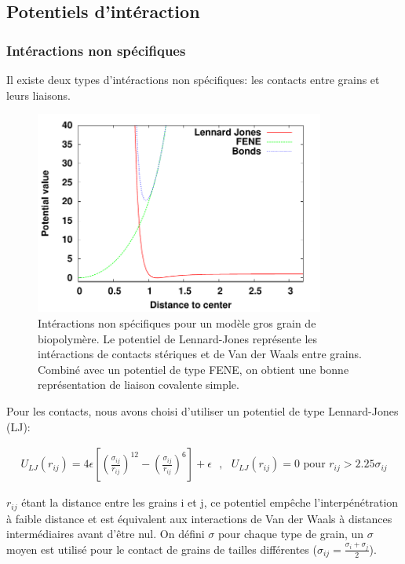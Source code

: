 \subsection{Potentiels d'intéraction}

\subsubsection{Intéractions non spécifiques}

Il existe deux types d'intéractions non spécifiques: les contacts entre grains et leurs liaisons. 

\begin{figure}[H]
\begin{center}
\includegraphics[width=0.85\textwidth]{nonspec.pdf}

\caption[Potentiels stériques]{Intéractions non spécifiques pour un modèle gros grain de biopolymère. Le potentiel de Lennard-Jones représente les intéractions de contacts stériques et de Van der Waals entre grains. Combiné avec un potentiel de type FENE, on obtient une bonne représentation de liaison covalente simple.}
\label{nonspecificinterac}
\end{center}
\end{figure}


Pour les contacts, nous avons choisi d'utiliser un potentiel de type Lennard-Jones (LJ):

\begin{eqnarray}
U_{LJ}(r_{ij})= 4\epsilon \left[\left(\frac{\sigma_{ij}}{r_{ij}}\right)^{12}-\left(\frac{\sigma_{ij}}{r_{ij}}\right)^{6}\right] + \epsilon \text{ }, \text{ } U_{LJ}(r_{ij})=0 \text{ pour }  r_{ij}> 2.25 \sigma_{ij}
\end{eqnarray}

$r_{ij}$ étant la distance entre les grains i et j, ce potentiel empêche l'interpénétration à faible distance et est équivalent aux interactions de Van der Waals à distances intermédiaires avant d'être nul. On défini $\sigma$ pour chaque type de grain, un $\sigma$ moyen est utilisé pour le contact de grains de tailles différentes ($\sigma_{ij}=\frac{\sigma_i+\sigma_j}{2}$).

